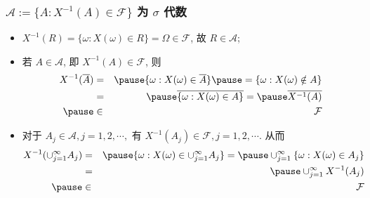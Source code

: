 \begin{frame}
	\frametitle{$\mathcal{A}:=\{A:X^{-1}(A)\in \mathcal{F}\}$ 为 $\sigma$ 代数}
	\begin{itemize}[<+-|alert@+>]
		\item $X^{-1}(R)=\{\omega:X (\omega)\in R\}=\Omega\in \mathcal{F}$, 故 $R\in\mathcal{A}$;
		\item 若 $A\in\mathcal{A}$, 即 $X^{-1}(A)\in \mathcal{F}$, 则
		      \begin{eqnarray*}
			      X^{-1}(\overline{A})&=&\pause \{\omega: X(\omega)\in \overline{A}\}\pause =\{\omega:X(\omega)\notin A\}\\
			      &=&\pause \overline{\{\omega:X(\omega)\in A\}}=\pause \overline{X^{-1}(A)}\\ \pause &\in&  \mathcal{F}
		      \end{eqnarray*}
		\item 对于 $A_j\in \mathcal{A}, j=1,2,\cdots,$ 有 $X^{-1}(A_j)\in \mathcal{F},j=1,2,\cdots.$ 从而
		      \begin{eqnarray*}
			      X^{-1}(\cup_{j=1}^\infty A_j)&=&\pause \{\omega:X(\omega)\in\cup_{j=1}^\infty A_j\}
			      =\pause \cup_{j=1}^\infty \{\omega:X(\omega)\in A_j\}\\
			      &=&\pause \cup_{j=1}^\infty X^{-1}(A_j)\\ \pause &\in&\mathcal{F}
		      \end{eqnarray*}

	\end{itemize}
\end{frame}


